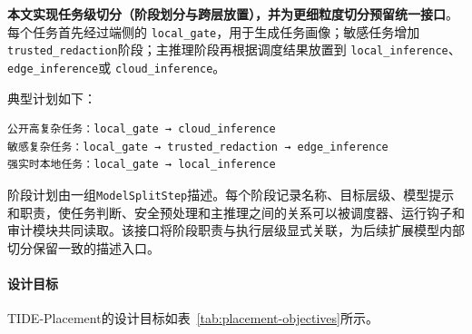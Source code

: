 \textbf{本文实现任务级切分（阶段划分与跨层放置），并为更细粒度切分预留统一接口}。每个任务首先经过端侧的
\texttt{local\_gate}，用于生成任务画像；敏感任务增加
\texttt{trusted\_redaction}阶段；主推理阶段再根据调度结果放置到
\texttt{local\_inference}、\texttt{edge\_inference}或
\texttt{cloud\_inference}。

典型计划如下：
\begin{verbatim}
公开高复杂任务：local_gate → cloud_inference
敏感复杂任务：local_gate → trusted_redaction → edge_inference
强实时本地任务：local_gate → local_inference
\end{verbatim}

阶段计划由一组\texttt{ModelSplitStep}描述。每个阶段记录名称、目标层级、模型提示和职责，使任务判断、安全预处理和主推理之间的关系可以被调度器、运行钩子和审计模块共同读取。该接口将阶段职责与执行层级显式关联，为后续扩展模型内部切分保留一致的描述入口。


\paragraph{设计目标}

TIDE-Placement的设计目标如表~\ref{tab:placement-objectives}所示。



